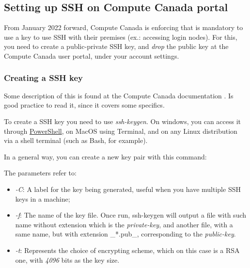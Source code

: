 \documentclass[
]{book}
\newenvironment{Shaded}{\begin{snugshade}}{\end{snugshade}}
\newcommand{\AttributeTok}[1]{\textcolor[rgb]{0.77,0.63,0.00}{#1}}
\newcommand{\ExtensionTok}[1]{#1}
\newcommand{\NormalTok}[1]{#1}
\newcommand{\StringTok}[1]{\textcolor[rgb]{0.31,0.60,0.02}{#1}}
\providecommand{\tightlist}{%
  \setlength{\itemsep}{0pt}\setlength{\parskip}{0pt}}
\begin{document}
\hypertarget{setting-up-ssh-on-compute-canada-portal}{%
\subsection{Setting up SSH on Compute Canada portal}\label{setting-up-ssh-on-compute-canada-portal}}

From January 2022 forward, Compute Canada is enforcing that is mandatory to use
a key to use SSH with their premises (ex.: accessing login nodes). For this, you
need to create a public-private SSH key, and \emph{drop} the public key at the
Compute Canada user portal, under your account settings.

\hypertarget{creating-a-ssh-key}{%
\subsubsection{Creating a SSH key}\label{creating-a-ssh-key}}

Some description of this is found at the Compute Canada documentation \citet{CC_ssh_key} .
Is good practice to read it, since it covers some specifics.

To create a SSH key you need to use \emph{ssh-keygen}. On windows, you can access it
through \href{https://docs.microsoft.com/en-us/windows-server/administration/openssh/openssh_keymanagement\#user-key-generation}{PowerShell}, on MacOS using Terminal, and on any Linux
distribution via a shell terminal (such as Bash, for example).

In a general way, you can create a new key pair with this command:

\begin{Shaded}
\end{Shaded}

The parameters refer to:

\begin{itemize}
\tightlist
\item
  \emph{-C}: A label for the key being generated, useful when you have multiple SSH
  keys in a machine;
\item
  \emph{-f}: The name of the key file. Once run, ssh-keygen will output a file with
  such name without extension which is the \emph{private-key}, and another file, with a
  same name, but with extension \_*.pub\_, corresponding to the \emph{public-key}.
\item
  \emph{-t}: Represents the choice of encrypting scheme, which on this case is a RSA
  one, with \emph{4096} bits as the key size.
\end{itemize}
\end{document}
